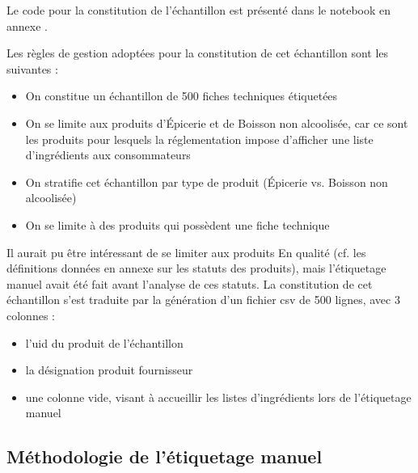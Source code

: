             Le code pour la constitution de l'échantillon est présenté dans le notebook en annexe .

            Les règles de gestion adoptées pour la constitution de cet échantillon sont les suivantes :
            \begin{itemize}
                \item On constitue un échantillon de 500 fiches techniques étiquetées
                \item On se limite aux produits d'\'{E}picerie et de Boisson non alcoolisée, car ce sont les produits pour lesquels la réglementation impose d'afficher une liste d'ingrédients aux consommateurs
                \item On stratifie cet échantillon par type de produit (\'{E}picerie vs. Boisson non alcoolisée)
                \item On se limite à des produits qui possèdent une fiche technique
            \end{itemize}
            Il aurait pu être intéressant de se limiter aux produits \og En qualité \fg (cf. les définitions données en annexe  sur les statuts des produits), mais l'étiquetage manuel avait été fait avant l'analyse de ces statuts.
            La constitution de cet échantillon s'est traduite par la génération d'un fichier csv de 500 lignes, avec 3 colonnes : 
            \begin{itemize}
                \item l'uid du produit de l'échantillon
                \item la désignation produit fournisseur
                \item une colonne vide, visant à accueillir les listes d'ingrédients lors de l'étiquetage manuel
            \end{itemize}

            \subsection{Méthodologie de l'étiquetage manuel}

